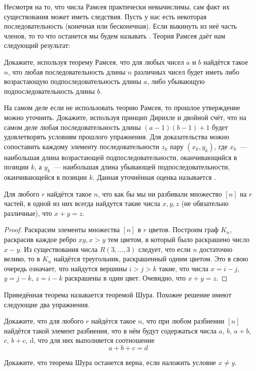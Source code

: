 Несмотря на то, что числа Рамсея практически невычислимы, сам факт их существования может иметь следствия. Пусть у нас есть некоторая последовательность (конечная или бесконечная). Если выкинуть из неё часть членов, то то что останется мы будем называть . Теория Рамсея даёт нам следующий результат:

\begin{exercise}
Докажите, используя теорему Рамсея, что для любых чисел $a$ и $b$ найдётся такое $n$, что любая последовательность длины $n$ различных чисел  будет иметь либо возрастающую подпоследовательность длины $a$, либо убывающую подпоследовательность длины $b$.
\end{exercise}

\begin{exercise}
На самом деле если не использовать теорию Рамсея, то прошлое утверждение можно уточнить. Докажите, используя принцип Дирихле и двойной счёт, что на самом деле любая последовательность длины $(a-1)(b-1)+1$ будет удовлетворять условиям прошлого упражнения. Для доказательства можно сопоставить каждому элементу последовательности $z_k$ пару $(x_k, y_k)$, где $x_k$~— наибольшая длина возрастающей подпоследовательности, оканчивающийся в позиции $k$, а $y_k$~— наибольшая длина убывающей подпоследовательности, оканчивающейся в позиции $k$. Данная уточнённая оценка называется .
\end{exercise}

\begin{thm}
Для любого $r$ найдётся такое $n$, что как бы мы ни разбивали множество $[n]$ на $r$ частей, в одной из них всегда найдутся такие числа $x, y, z$ (не обязательно различные), что $x+y=z$.
\end{thm}
\begin{proof}
Раскрасим элементы множества $[n]$ в $r$ цветов. Построим граф $K_n$, раскрасив каждое ребро $xy, x>y$ тем цветом, в который было раскрашено число $x-y$. Из существования числа $R(3, \ldots, 3)$ следует, что если $n$ достаточно велико, то в $K_n$ найдётся треугольник, раскрашенный одним цветом. Это в свою очередь означает, что найдутся вершины $i> j> k$ такие, что числа $x=i-j$, $y=j-k$, $z=i-k$ раскрашены в один цвет. Очевидно, что $x + y = z$.
\end{proof}

Приведённая теорема называется теоремой Шура. Похожее решение имеют следующие два упражнения.

\begin{exercise}
Докажите, что для любого $r$ найдётся такое $n$, что при любом разбиении $[n]$ найдётся такой элемент разбиения, что в нём будут содержаться числа $a$, $b$, $a+b$, $c$, $b+c$, d, что для них выполняется соотношение
$$a+b+c = d$$
\end{exercise}

\begin{exercise}
Докажите, что теорема Шура останется верна, если наложить условие $x\not= y$.
\end{exercise}
